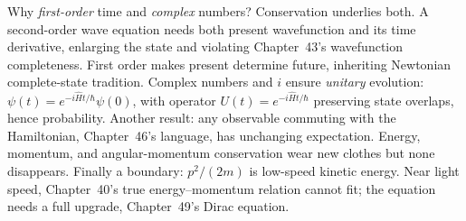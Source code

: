 \begin{challenge}
Why \emph{first-order} time and \emph{complex} numbers? Conservation underlies both. A second-order wave equation needs both present wavefunction and its time derivative, enlarging the state and violating Chapter~43's wavefunction completeness. First order makes present determine future, inheriting Newtonian complete-state tradition. Complex numbers and \(i\) ensure \emph{unitary} evolution: \(\psi(t)=e^{-i\hat{H}t/\hbar}\psi(0)\), with operator \(U(t)=e^{-i\hat{H}t/\hbar}\) preserving state overlaps, hence probability. Another result: any observable commuting with the Hamiltonian, Chapter~46's language, has unchanging expectation. Energy, momentum, and angular-momentum conservation wear new clothes but none disappears. Finally a boundary: \(p^{2}/(2m)\) is low-speed kinetic energy. Near light speed, Chapter~40's true energy--momentum relation cannot fit; the equation needs a full upgrade, Chapter~49's Dirac equation.
\end{challenge}


